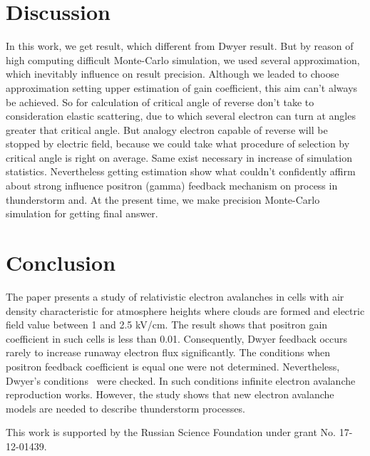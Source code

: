 \documentclass{webofc}
\begin{document}
    \section{Discussion}
    In this work, we get result, which different from Dwyer result. But by reason of high computing difficult Monte-Carlo simulation, we used several approximation, which inevitably influence on result precision. Although we leaded to choose approximation setting upper estimation of gain coefficient, this aim can't always be achieved. So for calculation of critical angle of reverse don't take to consideration elastic scattering, due to which several electron can turn at angles greater that critical angle. But analogy electron capable of reverse will be stopped by electric field, because we could take what procedure of selection by critical angle is right on average. Same exist necessary in increase of simulation statistics. Nevertheless getting estimation show what couldn't confidently affirm about strong influence positron (gamma) feedback mechanism on process in thunderstorm and. At the present time, we make precision Monte-Carlo simulation for getting final answer.
    
    \section{Conclusion}
    The paper presents a study of relativistic electron avalanches in cells with air density characteristic for atmosphere heights where clouds are formed and electric field value between 1 and 2.5 kV/cm. The result shows that positron gain coefficient in such cells is less than 0.01. Consequently, Dwyer feedback occurs rarely to increase runaway electron flux significantly.
    The conditions when positron feedback coefficient is equal one were not determined. Nevertheless, Dwyer’s conditions~\cite{dwyer2003fundamental} were checked. In such conditions infinite electron avalanche reproduction works. However, the study shows that new electron avalanche models are needed to describe thunderstorm processes.
    
    This work is supported by the Russian Science Foundation under grant No. 17-12-01439.
    
    {}
\end{document}
